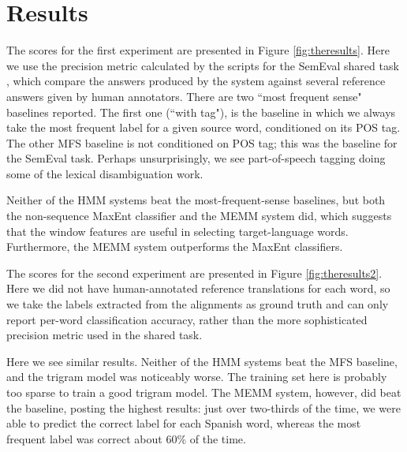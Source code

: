 \section{Results}
The scores for the first experiment are presented in Figure
\ref{fig:theresults}. Here we use the precision metric calculated by the
scripts for the SemEval shared task \cite{task10}, which compare the answers
produced by the system against several reference answers given by human
annotators. There are two ``most frequent sense" baselines reported.  The first
one (``with tag"), is the baseline in which we always take the most frequent
label for a given source word, conditioned on its POS tag. The other MFS
baseline is not conditioned on POS tag; this was the baseline for the SemEval
task.  Perhaps unsurprisingly, we see part-of-speech tagging doing some of the
lexical disambiguation work.

Neither of the HMM systems beat the most-frequent-sense baselines, but both the
non-sequence MaxEnt classifier and the MEMM system did, which suggests that the
window features are useful in selecting target-language words. Furthermore, the
MEMM system outperforms the MaxEnt classifiers.

The scores for the second experiment are presented in Figure
\ref{fig:theresults2}. Here we did not have human-annotated
reference translations for each word, so we take the labels extracted from the
alignments
as ground truth and can only report per-word classification accuracy,
rather than the more sophisticated precision metric used in the shared task.

Here we see similar results. Neither of the HMM systems beat the MFS baseline,
and the trigram model was noticeably worse. The training set here is probably
too sparse to train a good trigram model. The MEMM system, however, did beat
the baseline, posting the highest results: just over two-thirds of the time, we
were able to predict the correct label for each Spanish word, whereas the
most frequent label was correct about 60\% of the time.



